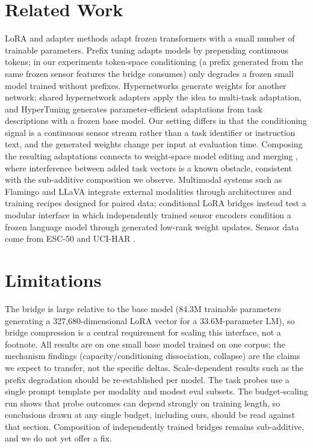 \documentclass[11pt]{article}
\begin{document}
\section{Related Work}
LoRA \cite{hu2021lora} and adapter methods \cite{houlsby2019adapters} adapt frozen transformers \cite{vaswani2017attention} with a small number of trainable parameters. Prefix tuning \cite{li2021prefixtuning} adapts models by prepending continuous tokens; in our experiments token-space conditioning (a prefix generated from the same frozen sensor features the bridge consumes) only degrades a frozen small model trained without prefixes. Hypernetworks \cite{ha2016hypernetworks} generate weights for another network; shared hypernetwork adapters \cite{mahabadi2021hyperformer} apply the idea to multi-task adaptation, and HyperTuning \cite{phang2022hypertuning} generates parameter-efficient adaptations from task descriptions with a frozen base model. Our setting differs in that the conditioning signal is a continuous sensor stream rather than a task identifier or instruction text, and the generated weights change per input at evaluation time. Composing the resulting adaptations connects to weight-space model editing and merging \cite{ilharco2023task}, where interference between added task vectors is a known obstacle, consistent with the sub-additive composition we observe. Multimodal systems such as Flamingo \cite{alayrac2022flamingo} and LLaVA \cite{liu2023llava} integrate external modalities through architectures and training recipes designed for paired data; conditional LoRA bridges instead test a modular interface in which independently trained sensor encoders condition a frozen language model through generated low-rank weight updates. Sensor data come from ESC-50 \cite{piczak2015esc} and UCI-HAR \cite{anguita2013uci}.

\section{Limitations}
The bridge is large relative to the base model (84.3M trainable parameters generating a 327,680-dimensional LoRA vector for a 33.6M-parameter LM), so bridge compression is a central requirement for scaling this interface, not a footnote. All results are on one small base model trained on one corpus; the mechanism findings (capacity/conditioning dissociation, collapse) are the claims we expect to transfer, not the specific deltas. Scale-dependent results such as the prefix degradation should be re-established per model. The task probes use a single prompt template per modality and modest eval subsets. The budget-scaling run shows that probe outcomes can depend strongly on training length, so conclusions drawn at any single budget, including ours, should be read against that section. Composition of independently trained bridges remains sub-additive, and we do not yet offer a fix.
\end{document}
